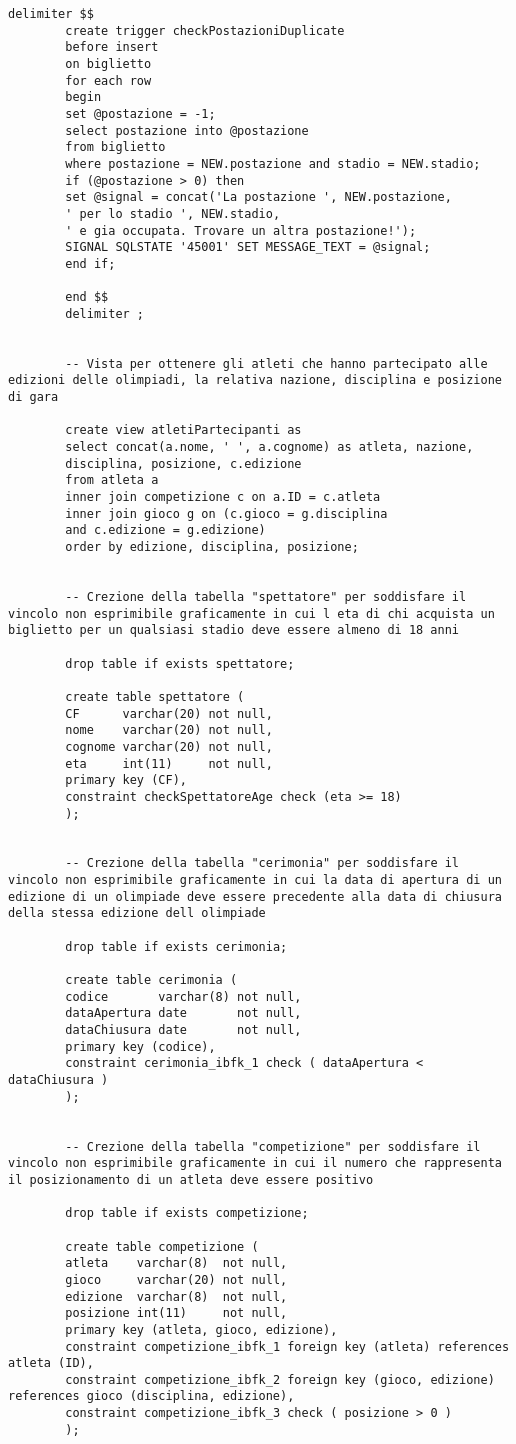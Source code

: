 \documentclass[paper=a4, fontsize=12 pt]{scrartcl} %
\begin{document}
\begin{lstlisting}[deletekeywords={IDENTITY,INT},
		morekeywords={clustered},    
		framesep=10pt,
		framextopmargin=10pt]
		delimiter $$
		create trigger checkPostazioniDuplicate
		before insert
		on biglietto
		for each row
		begin
		set @postazione = -1;
		select postazione into @postazione 
		from biglietto 
		where postazione = NEW.postazione and stadio = NEW.stadio;
		if (@postazione > 0) then
		set @signal = concat('La postazione ', NEW.postazione, 
		' per lo stadio ', NEW.stadio, 
		' e gia occupata. Trovare un altra postazione!');
		SIGNAL SQLSTATE '45001' SET MESSAGE_TEXT = @signal;
		end if;
		
		end $$
		delimiter ;
		
		
		-- Vista per ottenere gli atleti che hanno partecipato alle edizioni delle olimpiadi, la relativa nazione, disciplina e posizione di gara
		
		create view atletiPartecipanti as
		select concat(a.nome, ' ', a.cognome) as atleta, nazione, 
		disciplina, posizione, c.edizione
		from atleta a
		inner join competizione c on a.ID = c.atleta
		inner join gioco g on (c.gioco = g.disciplina 
		and c.edizione = g.edizione)
		order by edizione, disciplina, posizione;
		
		
		-- Crezione della tabella "spettatore" per soddisfare il vincolo non esprimibile graficamente in cui l eta di chi acquista un biglietto per un qualsiasi stadio deve essere almeno di 18 anni
		
		drop table if exists spettatore;
		
		create table spettatore (
		CF      varchar(20) not null,
		nome    varchar(20) not null,
		cognome varchar(20) not null,
		eta     int(11)     not null,
		primary key (CF),
		constraint checkSpettatoreAge check (eta >= 18)
		);
		
		
		-- Crezione della tabella "cerimonia" per soddisfare il vincolo non esprimibile graficamente in cui la data di apertura di un edizione di un olimpiade deve essere precedente alla data di chiusura della stessa edizione dell olimpiade
		
		drop table if exists cerimonia;
		
		create table cerimonia (
		codice       varchar(8) not null,
		dataApertura date       not null,
		dataChiusura date       not null,
		primary key (codice),
		constraint cerimonia_ibfk_1 check ( dataApertura < dataChiusura )
		);
		
		
		-- Crezione della tabella "competizione" per soddisfare il vincolo non esprimibile graficamente in cui il numero che rappresenta il posizionamento di un atleta deve essere positivo
		
		drop table if exists competizione;
		
		create table competizione (
		atleta    varchar(8)  not null,
		gioco     varchar(20) not null,
		edizione  varchar(8)  not null,
		posizione int(11)     not null,
		primary key (atleta, gioco, edizione),
		constraint competizione_ibfk_1 foreign key (atleta) references atleta (ID),
		constraint competizione_ibfk_2 foreign key (gioco, edizione) references gioco (disciplina, edizione),
		constraint competizione_ibfk_3 check ( posizione > 0 )
		);
	\end{lstlisting}
	
\end{document}
